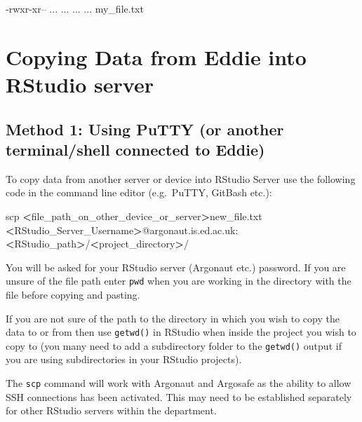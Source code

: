 \documentclass[]{book}
\newenvironment{Shaded}{\begin{snugshade}}{\end{snugshade}}
\newcommand{\ExtensionTok}[1]{#1}
\newcommand{\FunctionTok}[1]{\textcolor[rgb]{0.00,0.00,0.00}{#1}}
\newcommand{\NormalTok}[1]{#1}
\newcommand{\OperatorTok}[1]{\textcolor[rgb]{0.81,0.36,0.00}{\textbf{#1}}}
\begin{document}
\begin{Shaded}
\begin{Highlighting}[]
\ExtensionTok{-rwxr-xr--}\NormalTok{ ... ... ... ... my_file.txt}
\end{Highlighting}
\end{Shaded}

\hypertarget{copying-data-from-eddie-into-rstudio-server}{%
\section{Copying Data from Eddie into RStudio server}\label{copying-data-from-eddie-into-rstudio-server}}

\hypertarget{method-1-using-putty-or-another-terminalshell-connected-to-eddie}{%
\subsection{Method 1: Using PuTTY (or another terminal/shell connected to Eddie)}\label{method-1-using-putty-or-another-terminalshell-connected-to-eddie}}

To copy data from another server or device into RStudio Server use the following code in the command line editor (e.g.~PuTTY, GitBash etc.):

\begin{Shaded}
\begin{Highlighting}[]
\FunctionTok{scp} \OperatorTok{<}\NormalTok{file_path_on_other_device_or_server}\OperatorTok{>}\NormalTok{new_file.txt }\OperatorTok{<}\NormalTok{RStudio_Server_Username}\OperatorTok{>}\NormalTok{@argonaut.is.ed.ac.uk:}\OperatorTok{<}\NormalTok{RStudio_path}\OperatorTok{>}\NormalTok{/}\OperatorTok{<}\NormalTok{project_directory}\OperatorTok{>}\NormalTok{/}
\end{Highlighting}
\end{Shaded}

You will be asked for your RStudio server (Argonaut etc.) password. If you are unsure of the file path enter \texttt{pwd} when you are working in the directory with the file before copying and pasting.

If you are not sure of the path to the directory in which you wish to copy the data to or from then use \texttt{getwd()} in RStudio when inside the project you wish to copy to (you many need to add a subdirectory folder to the \texttt{getwd()} output if you are using subdirectories in your RStudio projects).

The \texttt{scp} command will work with Argonaut and Argosafe as the ability to allow SSH connections has been activated. This may need to be established separately for other RStudio servers within the department.
\end{document}
